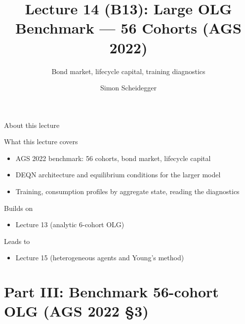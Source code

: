 \documentclass[aspectratio=169,11pt]{beamer}
\title[Lecture 14 (B13)]{Lecture 14 (B13): Large OLG Benchmark --- 56 Cohorts (AGS 2022)}
\subtitle{Bond market, lifecycle capital, training diagnostics}
\author{Simon Scheidegger}
\institute{HEC, University of Lausanne}
\date{}
\begin{document}
\providecommand{\exercisepause}{%
  \tikz[baseline=(X.base)]{\node[fill=darkgreen!80!black, text=white,
  rounded corners=2pt, inner sep=3pt, font=\scriptsize\bfseries](X){PAUSE};}}

{
\begin{frame}
\titlepage
\end{frame}
}

\begin{frame}{About this lecture}
\small
\begin{block}{What this lecture covers}
\begin{itemize}\itemsep2pt
  \item AGS 2022 benchmark: 56 cohorts, bond market, lifecycle capital
  \item DEQN architecture and equilibrium conditions for the larger model
  \item Training, consumption profiles by aggregate state, reading the diagnostics
\end{itemize}
\end{block}
\begin{block}{Builds on}
\begin{itemize}\itemsep2pt
  \item Lecture 13 (analytic 6-cohort OLG)
\end{itemize}
\end{block}
\begin{block}{Leads to}
\begin{itemize}\itemsep2pt
  \item Lecture 15 (heterogeneous agents and Young's method)
\end{itemize}
\end{block}
\end{frame}

\section{Part III: Benchmark 56-cohort OLG (AGS 2022 \S 3)}
\end{document}
